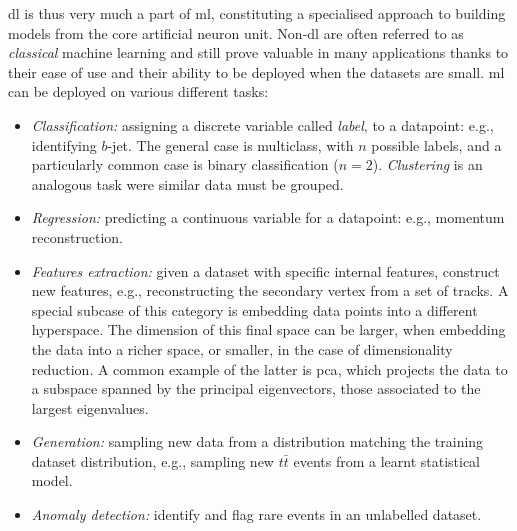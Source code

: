 \gls{dl} is thus very much a part of \gls{ml}, constituting a specialised approach to building models from the core artificial neuron unit. Non-\gls{dl} are often referred to as \textit{classical} machine learning and still prove valuable in many applications thanks to their ease of use and their ability to be deployed when the datasets are small. \gls{ml} can be deployed on various different tasks: 
\begin{itemize}
    \item \textit{Classification:} assigning a discrete variable called \textit{label}, to a datapoint: e.g., identifying $b$-jet. The general case is multiclass, with $n$ possible labels, and a particularly common case is binary classification ($n = 2$). \textit{Clustering} is an analogous task were similar data must be grouped.
    \item \textit{Regression:} predicting a continuous variable for a datapoint: e.g., momentum reconstruction. 
    \item \textit{Features extraction:} given a dataset with specific internal features, construct new features, e.g., reconstructing the secondary vertex from a set of tracks. A special subcase of this category is embedding data points into a different hyperspace. The dimension of this final space can be larger, when embedding the data into a richer space, or smaller, in the case of dimensionality reduction. A common example of the latter is \gls{pca}, which projects the data to a subspace spanned by the principal eigenvectors, those associated to the largest eigenvalues.
    \item \textit{Generation:} sampling new data from a distribution matching the training dataset distribution, e.g., sampling new $t\bar{t}$ events from a learnt statistical model. 
    \item \textit{Anomaly detection:} identify and flag rare events in an unlabelled dataset.
\end{itemize}


